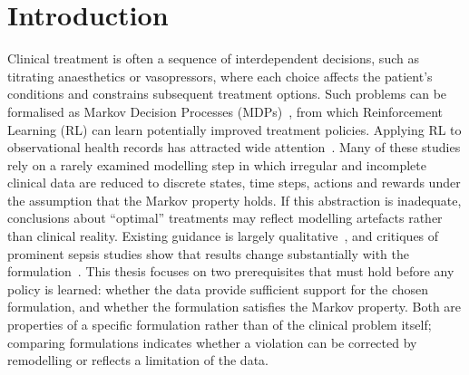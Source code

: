 \documentclass[runningheads]{llncs}
\begin{document}
\section{Introduction}
Clinical treatment is often a sequence of interdependent decisions, such as titrating anaesthetics or vasopressors, where each choice affects the patient’s conditions and constrains subsequent treatment options. Such problems can be formalised as Markov Decision Processes (MDPs)~\cite{Puterman1994}, from which Reinforcement Learning (RL) can learn potentially improved treatment policies. Applying RL to observational health records has attracted wide attention~\cite{Komorowski2018}. Many of these studies rely on a rarely examined modelling step in which irregular and incomplete clinical data are reduced to discrete states, time steps, actions and rewards under the assumption that the Markov property holds. If this abstraction is inadequate, conclusions about ``optimal'' treatments may reflect modelling artefacts rather than clinical reality. Existing guidance is largely qualitative~\cite{Gottesman2019}, and critiques of prominent sepsis studies show that results change substantially with the formulation~\cite{Jeter2019,Luo2024}. This thesis focuses on two prerequisites that must hold before any policy is learned: whether the data provide sufficient support for the chosen formulation, and whether the formulation satisfies the Markov property. Both are properties of a specific formulation rather than of the clinical problem itself; comparing formulations indicates whether a violation can be corrected by remodelling or reflects a limitation of the data.
\end{document}
